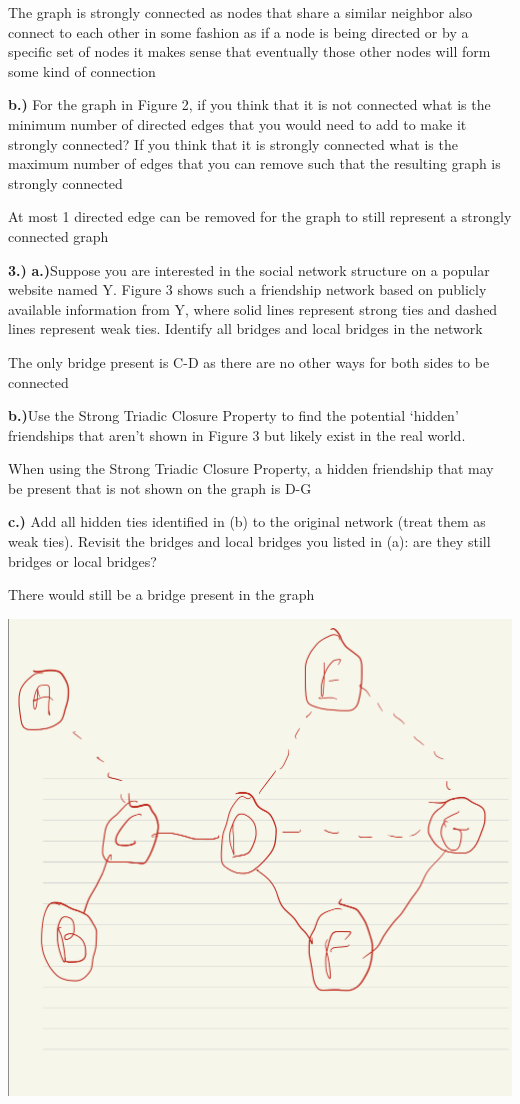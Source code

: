 \documentclass[
]{article}
\begin{document}
The graph is strongly connected as nodes that share a similar neighbor
also connect to each other in some fashion as if a node is being
directed or by a specific set of nodes it makes sense that eventually
those other nodes will form some kind of connection

\textbf{b.)} For the graph in Figure 2, if you think that it is not
connected what is the minimum number of directed edges that you would
need to add to make it strongly connected? If you think that it is
strongly connected what is the maximum number of edges that you can
remove such that the resulting graph is strongly connected

At most 1 directed edge can be removed for the graph to still represent
a strongly connected graph

\textbf{3.)} \textbf{a.)}Suppose you are interested in the social
network structure on a popular website named Y. Figure 3 shows such a
friendship network based on publicly available information from Y, where
solid lines represent strong ties and dashed lines represent weak ties.
Identify all bridges and local bridges in the network

The only bridge present is C-D as there are no other ways for both sides
to be connected

\textbf{b.)}Use the Strong Triadic Closure Property to find the
potential `hidden' friendships that aren't shown in Figure 3 but likely
exist in the real world.

When using the Strong Triadic Closure Property, a hidden friendship that
may be present that is not shown on the graph is D-G

\textbf{c.)} Add all hidden ties identified in (b) to the original
network (treat them as weak ties). Revisit the bridges and local bridges
you listed in (a): are they still bridges or local bridges?

There would still be a bridge present in the graph

\includegraphics{graph2.jpg}
\end{document}
